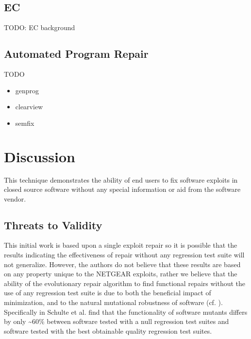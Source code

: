 \documentclass{sigcomm-alternate}
\begin{document}
\subsection{EC}
\label{sec-5-2}
TODO: EC background
\subsection{Automated Program Repair}
\label{sec-5-3}
TODO
\begin{itemize}
\item genprog
\item clearview
\item semfix
\end{itemize}
\section{Discussion}
\label{sec-6}
This technique demonstrates the ability of end users to fix software
exploits in closed source software without any special information or
aid from the software vendor.

\subsection{Threats to Validity}
\label{sec-6-1}
This initial work is based upon a single exploit repair so it is
possible that the results indicating the effectiveness of repair
without any regression test suite will not generalize.  However, the
authors do not believe that these results are based on any property
unique to the NETGEAR exploits, rather we believe that the ability of
the evolutionary repair algorithm to find functional repairs without
the use of any regression test suite is due to both the beneficial
impact of minimization, and to the natural mutational robustness of
software (cf. \cite{schulte2013software}).  Specifically in
\cite{schulte2013software} Schulte et al. find that the functionality of
software mutants differs by only \textasciitilde{}60\% between software tested with a
null regression test suites and software tested with the best
obtainable quality regression test suites.
\end{document}
